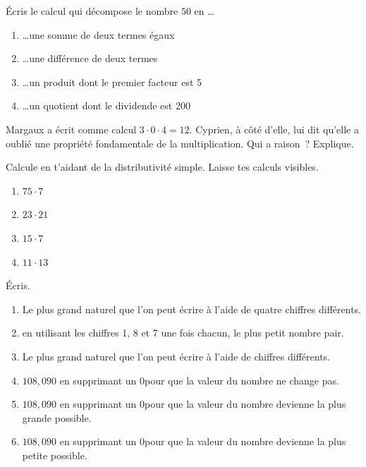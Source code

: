 \documentclass[syllabus_1.tex]{subfiles}
\begin{document}
\begin{exercise}
    Écris le calcul qui décompose le nombre \(50\) en  \dots
    \begin{enumerate}
        \item \dots une somme de deux termes égaux
        \item \dots une différence de deux termes
        \item \dots un produit dont le premier facteur est 5
        \item \dots un quotient dont le dividende est 200~
    \end{enumerate}
\end{exercise}

\begin{exercise}
    Margaux a écrit comme calcul \og \(3 \cdot 0 \cdot 4 = 12\)\fg.
    Cyprien, à côté d'elle, lui dit qu'elle a oublié une propriété
    fondamentale de la multiplication. Qui a raison~? Explique.
\end{exercise}

\begin{exercise}
    Calcule en t'aidant de la distributivité simple. Laisse tes calculs visibles.
    \begin{enumerate}[cols=4]
        \item \(75 \cdot 7\)
        \item \(23 \cdot 21 \)
        \item $15 \cdot 7$
        \item $11 \cdot 13$
    \end{enumerate}
\end{exercise}

\begin{exercise}
    Écris.

    \begin{enumerate}
        \item  Le plus grand naturel que l'on peut écrire à l'aide de quatre chiffres différents.
        \item  en utilisant les chiffres 1, 8 et 7 une fois chacun, le plus petit nombre pair.
        \item  Le plus grand naturel que l'on peut écrire à l'aide de chiffres différents.
        \item  \(108,090\) en supprimant un \og \(0\)\fg pour que la valeur du nombre ne change pas.
        \item  \(108,090\) en supprimant un \og \(0\)\fg pour que la valeur du nombre devienne la plus grande possible.
        \item  \(108,090\) en supprimant un \og \(0\)\fg pour que la valeur du nombre devienne la plus petite possible.
    \end{enumerate}
\end{exercise}
\end{document}
